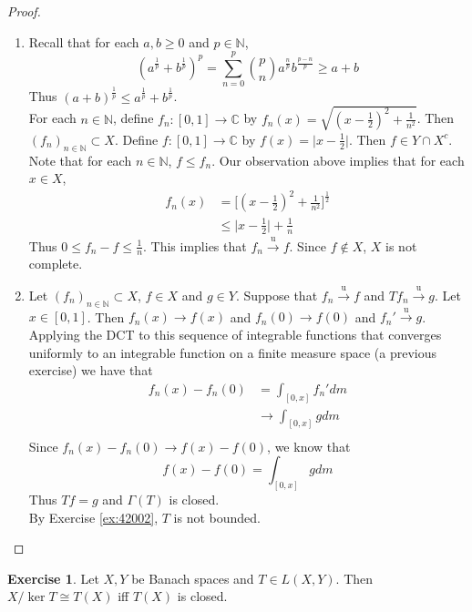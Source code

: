 \documentclass[12pt]{amsart}
\theoremstyle{definition}
\newtheorem{ex}[definition]{Exercise}
\newcommand{\Gam}{\Gamma}
\newcommand{\C}{\mathbb{C}}
\newcommand{\N}{\mathbb{N}}
\newcommand{\convt}[1]{\xrightarrow{\text{#1}}}
\newcommand{\conv}[1]{\xrightarrow{#1}}
\DeclareMathOperator*{\0}{\mbf{0}}
\DeclareMathOperator*{\1}{\mbf{1}}
\newcommand{\lex}[1]{\label{ex:#1}}
\newcommand{\rex}[1]{Exercise \ref{ex:#1}}
\begin{document}
	\begin{proof}
		\begin{enumerate}
			\item Recall that for each $a,b \geq 0$ and $p \in \N$, $$(a^{\frac{1}{p}}+b^{\frac{1}{p}})^p = \sum_{n=0}^p  {p \choose n} a^{\frac{n}{p}}b^{\frac{p-n}{p}} \geq a + b$$ Thus $(a+b)^{\frac{1}{p}} \leq a^{\frac{1}{p}}+b^{\frac{1}{p}}$.\\
			For each $n \in \N$, define $f_n: [0,1] \rightarrow \C$ by $f_n(x) = \sqrt{(x-\frac{1}{2})^2+ \frac{1}{n^2}}$. Then $(f_n)_{n \in \N} \subset X$. Define $f:[0,1] \rightarrow \C$ by $f(x) = \vert x-\frac{1}{2}\vert$. Then $f \in Y \cap X^c$. Note that for each $n \in \N$, $f \leq f_n$. Our observation above implies that for each $x \in X$,
			\begin{align*}
				f_n(x) 
				&= \bigg[ (x-\frac{1}{2})^2 + \frac{1}{n^2} \bigg]^{\frac{1}{2}}\\
				& \leq \vert x-\frac{1}{2} \vert + \frac{1}{n}
			\end{align*}
			Thus $0 \leq f_n - f \leq \frac{1}{n} $. This implies that $f_n \convt{u} f$. Since $f \not \in X$, $X$ is not complete. \vspace{.5cm}\\
			\item Let $(f_n)_{n \in \N} \subset X$, $f \in X$ and $g \in Y$. Suppose that $f_n \convt{u} f$ and $Tf_n \convt{u} g$. Let $x \in [0,1]$. Then $f_n(x) \conv{} f(x)$ and $f_n(0) \conv{} f(0)$ and $f_n' \convt{u} g$. Applying the DCT to this sequence of integrable functions that converges uniformly to an integrable function on a finite measure space (a previous exercise) we have that
			\begin{align*}
				f_n(x) - f_n(0) 
				&= \int_{[0,x]} f_n' dm \\
				& \rightarrow \int_{[0,x]} g dm \\ 
			\end{align*} 
			Since $f_n(x) - f_n(0) \conv{} f(x) - f(0)$, we know that $$f(x) - f(0) = \int_{[0,x]} g dm$$ Thus $Tf = g$ and $\Gam(T)$ is closed. \\
			By \rex{42002}, $T$ is not bounded.
		\end{enumerate}
	\end{proof}
	
	\begin{ex} \lex{}
		Let $X, Y$ be Banach spaces and $T \in L(X,Y)$. Then $X/\ker T \cong T(X)$ iff $T(X)$ is closed.
	\end{ex}
	
\end{document}
